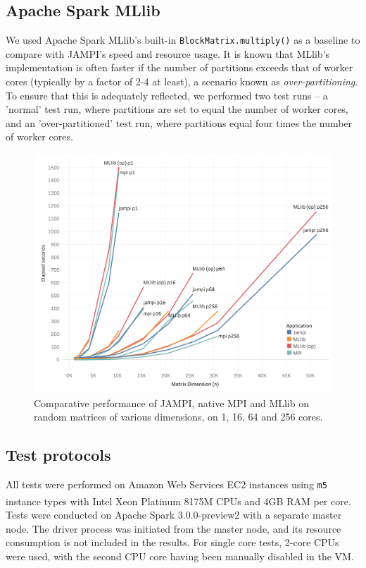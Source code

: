 \documentclass[fleqn,10pt]{SelfArx} %
\begin{document}

\subsection{Apache Spark MLlib}

We used Apache Spark MLlib's built-in \texttt{BlockMatrix.multiply()} as a baseline to compare with JAMPI's speed and resource usage. It is known that MLlib's implementation is often faster if the number of partitions exceeds that of worker cores (typically by a factor of 2-4 at least), a scenario known as \emph{over-partitioning}. To ensure that this is adequately reflected, we performed two test runs – a 'normal' test run, where partitions are set to equal the number of worker cores, and an 'over-partitioned' test run, where partitions equal four times the number of worker cores.

\begin{figure}
	\centering
	\includegraphics[width=0.9\linewidth]{overall_performance}
	\vspace{14pt}
	\caption{Comparative performance of JAMPI, native MPI and MLlib on random matrices of various dimensions, on 1, 16, 64 and 256 cores.}
	\label{fig:overall_performance}
\end{figure}
\subsection{Test protocols} %
\label{sub:test_protocols}

All tests were performed on Amazon Web Services EC2 instances using \texttt{m5} instance types with Intel\textsuperscript{\textregistered} Xeon\textsuperscript{\textregistered} Platinum 8175M CPUs and 4GB RAM per core. Tests were conducted on Apache Spark 3.0.0-preview2 with a separate master node. The driver process was initiated from the master node, and its resource consumption is not included in the results. For single core tests, 2-core CPUs were used, with the second CPU core having been manually disabled in the VM.
\end{document}

